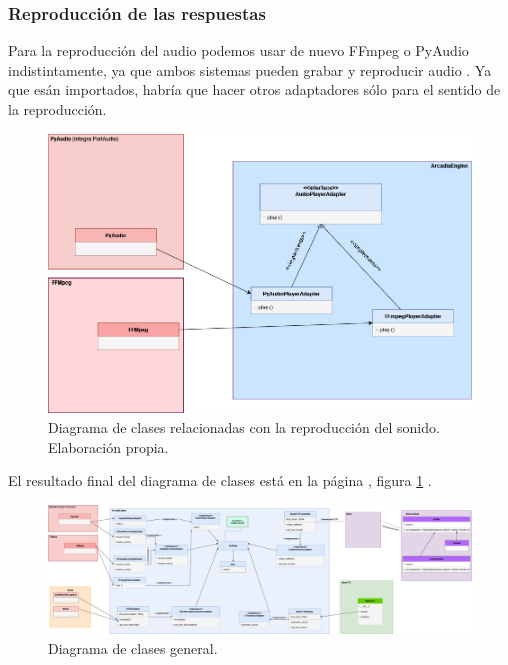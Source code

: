 \subsubsection{Reproducción de las respuestas}
Para la reproducción del audio podemos usar de nuevo FFmpeg o PyAudio indistintamente, ya que ambos sistemas pueden grabar y reproducir audio . Ya que esán importados, habría que hacer otros adaptadores sólo para el sentido de la reproducción.

\begin{figure}[H]
	\includegraphics[width=\textwidth]{imagenes/DiagramaClases_Reproduccion.png}
	\caption{Diagrama de clases relacionadas con la reproducción del sonido. Elaboración propia.}
\end{figure}

El resultado final del diagrama de clases está en la página \pageref{fig:diagramaclases}, figura \ref{fig:diagramaclases} .
\begin{landscape}
	\begin{figure}
		\includegraphics[width=1.5\textwidth]{imagenes/DiagramaClases_General.png}
		\caption{Diagrama de clases general.}
		\label{fig:diagramaclases}
	\end{figure}
\end{landscape}

